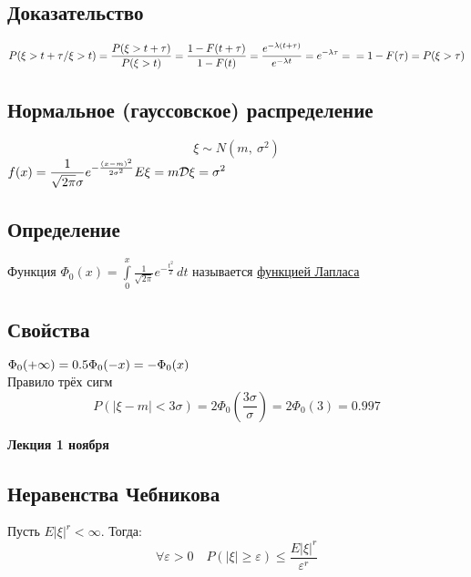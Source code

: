\documentclass[12pt, a4paper]{article}
\begin{document}
    \subsection*{Доказательство}
    $\displaystyle P(\xi > t + \tau / \xi > t) = \frac{P(\xi > t + \tau)}{P(\xi > t)} = \frac{1 - F(t + \tau)}{1 - F(t)} = \frac{e^{-\lambda(t + \tau)}}{e^{-\lambda t}} = e^{-\lambda \tau} =\\
    = 1 - F(\tau) = P(\xi > \tau)$
    \subsection*{Нормальное (гауссовское) распределение}
    \[\xi \sim N(m,\ \sigma^2)\]
    $f(x) = \displaystyle\frac{1}{\sqrt{2\pi}\sigma} e^{-\frac{(x - m)^2}{2\sigma^2}}\\
    E\xi = m\\
    \mathcal{D}\xi = \sigma^2$
    \subsection*{Определение}
    Функция $\Phi_0(x) = \displaystyle \int\limits_{0}^{x} \frac{1}{\sqrt{2\pi}}e^{-\frac{t^2}{2}}\, dt$ называется \underline{функцией Лапласа}
    \subsection*{Свойства}
    $\Phi_0 (+\infty) = 0.5\\
    \Phi_0(-x) = -\Phi_0(x)$\\
    Правило трёх сигм
    \[P(|\xi - m| < 3\sigma) = 2\Phi_0\left( \frac{3\sigma}{\sigma} \right) = 2\Phi_0(3) = 0.997\]
    \begin{center}
        \bf Лекция 1 ноября
    \end{center}
    \subsection*{Неравенства Чебникова}
    Пусть $E|\xi|^r < \infty$. Тогда:
    \[\forall \varepsilon > 0\quad P(|\xi| \geq \varepsilon) \leq \frac{E|\xi|^r}{\varepsilon^r}\]
\end{document}
